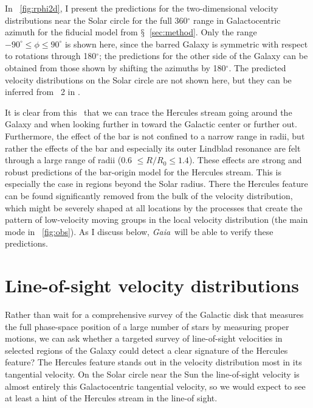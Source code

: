 \documentclass[12pt,preprint]{aastex}
\newcommand{\sectionname}{$\mathsection$}
\newcommand{\Gaia}{\emph{Gaia}}
\newcommand{\Ro}{\ensuremath{R_0}}
\begin{document}
In \figurename~\ref{fig:rphi2d}, I present the predictions for the
two-dimensional velocity distributions near the Solar circle for the
full 360$^{\circ}$ range in Galactocentric azimuth for the fiducial
model from \sectionname~\ref{sec:method}. Only the range $-90^{\circ}
\leq \phi \leq 90^{\circ}$ is shown here, since the barred Galaxy is
symmetric with respect to rotations through 180$^{\circ}$; the
predictions for the other side of the Galaxy can be obtained from
those shown by shifting the azimuths by 180$^{\circ}$. The predicted
velocity distributions on the Solar circle are not shown here, but
they can be inferred from \figurename~2 in \citet{dehnen00a}.

It is clear from this \figurename\ that we can trace the Hercules
stream going around the Galaxy and when looking further in toward the
Galactic center or further out. Furthermore, the effect of the bar is
not confined to a narrow range in radii, but rather the effects of the
bar and especially its outer Lindblad resonance are felt through a
large range of radii (0.6 $\leq R/\Ro \leq 1.4$). These effects are
strong and robust predictions of the bar-origin model for the Hercules
stream. This is especially the case in regions beyond the Solar
radius. There the Hercules feature can be found significantly removed
from the bulk of the velocity distribution, which might be severely
shaped at all locations by the processes that create the pattern of
low-velocity moving groups in the local velocity distribution (the
main mode in \figurename~\ref{fig:obs}). As I discuss below, \Gaia\
will be able to verify these predictions.




\section{Line-of-sight velocity distributions}

Rather than wait for a comprehensive survey of the Galactic disk that
measures the full phase-space position of a large number of stars by
measuring proper motions, we can ask whether a targeted survey of
line-of-sight velocities in selected regions of the Galaxy could
detect a clear signature of the Hercules feature? The Hercules feature
stands out in the velocity distribution most in its tangential
velocity. On the Solar circle near the Sun the line-of-sight velocity
is almost entirely this Galactocentric tangential velocity, so we
would expect to see at least a hint of the Hercules stream in the
line-of sight.
\end{document}
